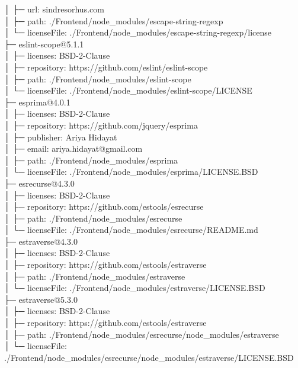 │  ├─ url: sindresorhus.com\\
│  ├─ path: ./Frontend/node\_modules/escape-string-regexp\\
│  └─ licenseFile: ./Frontend/node\_modules/escape-string-regexp/license\\
├─ eslint-scope@5.1.1\\
│  ├─ licenses: BSD-2-Clause\\
│  ├─ repository: https://github.com/eslint/eslint-scope\\
│  ├─ path: ./Frontend/node\_modules/eslint-scope\\
│  └─ licenseFile: ./Frontend/node\_modules/eslint-scope/LICENSE\\
├─ esprima@4.0.1\\
│  ├─ licenses: BSD-2-Clause\\
│  ├─ repository: https://github.com/jquery/esprima\\
│  ├─ publisher: Ariya Hidayat\\
│  ├─ email: ariya.hidayat@gmail.com\\
│  ├─ path: ./Frontend/node\_modules/esprima\\
│  └─ licenseFile: ./Frontend/node\_modules/esprima/LICENSE.BSD\\
├─ esrecurse@4.3.0\\
│  ├─ licenses: BSD-2-Clause\\
│  ├─ repository: https://github.com/estools/esrecurse\\
│  ├─ path: ./Frontend/node\_modules/esrecurse\\
│  └─ licenseFile: ./Frontend/node\_modules/esrecurse/README.md\\
├─ estraverse@4.3.0\\
│  ├─ licenses: BSD-2-Clause\\
│  ├─ repository: https://github.com/estools/estraverse\\
│  ├─ path: ./Frontend/node\_modules/estraverse\\
│  └─ licenseFile: ./Frontend/node\_modules/estraverse/LICENSE.BSD\\
├─ estraverse@5.3.0\\
│  ├─ licenses: BSD-2-Clause\\
│  ├─ repository: https://github.com/estools/estraverse\\
│  ├─ path: ./Frontend/node\_modules/esrecurse/node\_modules/estraverse\\
│  └─ licenseFile: ./Frontend/node\_modules/esrecurse/node\_modules/estraverse/LICENSE.BSD\\
